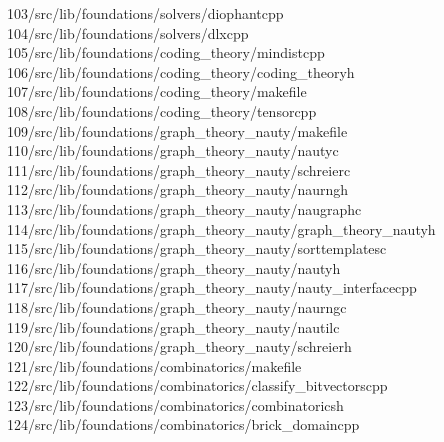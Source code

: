\begin{tabbing}
103\>/src/lib/foundations/solvers/diophantcpp\\[0pt]
104\>/src/lib/foundations/solvers/dlxcpp\\[0pt]
105\>/src/lib/foundations/coding\_theory/mindistcpp\\[0pt]
106\>/src/lib/foundations/coding\_theory/coding\_theoryh\\[0pt]
107\>/src/lib/foundations/coding\_theory/makefile\\[0pt]
108\>/src/lib/foundations/coding\_theory/tensorcpp\\[0pt]
109\>/src/lib/foundations/graph\_theory\_nauty/makefile\\[0pt]
110\>/src/lib/foundations/graph\_theory\_nauty/nautyc\\[0pt]
111\>/src/lib/foundations/graph\_theory\_nauty/schreierc\\[0pt]
112\>/src/lib/foundations/graph\_theory\_nauty/naurngh\\[0pt]
113\>/src/lib/foundations/graph\_theory\_nauty/naugraphc\\[0pt]
114\>/src/lib/foundations/graph\_theory\_nauty/graph\_theory\_nautyh\\[0pt]
115\>/src/lib/foundations/graph\_theory\_nauty/sorttemplatesc\\[0pt]
116\>/src/lib/foundations/graph\_theory\_nauty/nautyh\\[0pt]
117\>/src/lib/foundations/graph\_theory\_nauty/nauty\_interfacecpp\\[0pt]
118\>/src/lib/foundations/graph\_theory\_nauty/naurngc\\[0pt]
119\>/src/lib/foundations/graph\_theory\_nauty/nautilc\\[0pt]
120\>/src/lib/foundations/graph\_theory\_nauty/schreierh\\[0pt]
121\>/src/lib/foundations/combinatorics/makefile\\[0pt]
122\>/src/lib/foundations/combinatorics/classify\_bitvectorscpp\\[0pt]
123\>/src/lib/foundations/combinatorics/combinatoricsh\\[0pt]
124\>/src/lib/foundations/combinatorics/brick\_domaincpp\\[0pt]

\end{tabbing}
